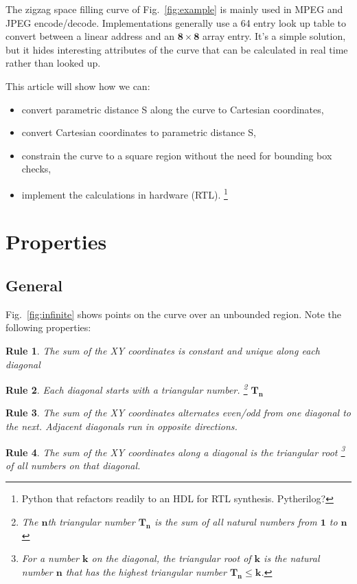 \documentclass[10pt]{article}
\theoremstyle{theorem}
\newtheorem{theorem}{Rule} %
\begin{document}
The zigzag space filling curve of Fig.~\ref{fig:example} is mainly used in MPEG
\cite{mpeg} and JPEG \cite{jpeg} encode/decode.  Implementations generally use
a 64 entry look up table to convert between a linear address and an
$\mathbf{8\times8}$ array entry.  It's a simple solution, but it hides
interesting attributes of the curve that can be calculated in real time rather
than looked up.

This article will show how we can:
\begin{itemize}
  \item convert parametric distance S along the curve to Cartesian coordinates,
  \item convert Cartesian coordinates to parametric distance S,
  \item constrain the curve to a square region without the need for bounding
    box checks,
  \item implement the calculations in hardware (RTL).
    \footnote{Python that refactors readily to an HDL for RTL synthesis.
    Pytherilog\texttrademark ?}
\end{itemize}


\section{Properties}

\subsection{General}
Fig.~\ref{fig:infinite} shows points on the curve over an unbounded region.
Note the following properties:

\begin{theorem} \label{thm:diagconstant}
  The sum of the XY coordinates is constant and unique along each diagonal
\end{theorem}
\begin{theorem} \label{thm:diagtrinum}
  Each diagonal starts with a triangular number.
  \footnote{The $\mathbf{n}$th triangular number $\mathbf{T_n}$ is the sum of all
    natural numbers from $\mathbf{1}$ to $\mathbf{n}$}
  $\mathbf{T_n}$
\end{theorem}
\begin{theorem} \label{thm:diagevenodd}
  The sum of the XY coordinates alternates even/odd from one diagonal to the
  next. Adjacent diagonals run in opposite directions.
\end{theorem}
\begin{theorem} \label{thm:diagtriroot}
  The sum of the XY coordinates along a diagonal is the triangular root
  \footnote{For a number $\mathbf{k}$ on the diagonal, the triangular root of
    $\mathbf{k}$ is the natural number $\mathbf{n}$ that has the highest
    triangular number $\mathbf{T_n \leq k}$.}
  of all numbers on that diagonal.
\end{theorem}
\end{document}
